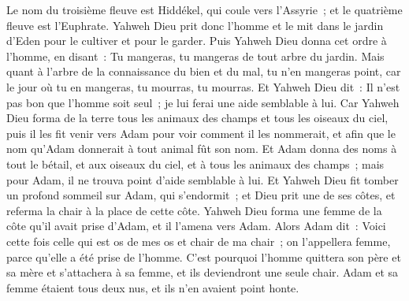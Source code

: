 \begin{multicols}{2}
Le nom du troisième fleuve est Hiddékel, qui coule vers l'Assyrie~; et le quatrième fleuve est l'Euphrate.
Yahweh Dieu prit donc l'homme et le mit dans le jardin d'Eden pour le cultiver et pour le garder.
Puis Yahweh Dieu donna cet ordre à l'homme, en disant~: Tu mangeras, tu mangeras de tout arbre du jardin.
Mais quant à l'arbre de la connaissance du bien et du mal, tu n'en mangeras point, car le jour où tu en mangeras, tu mourras, tu mourras.
Et Yahweh Dieu dit~: Il n'est pas bon que l'homme soit seul~; je lui ferai une aide semblable à lui.
Car Yahweh Dieu forma de la terre tous les animaux des champs et tous les oiseaux du ciel, puis il les fit venir vers Adam pour voir comment il les nommerait, et afin que le nom qu'Adam donnerait à tout animal fût son nom.
Et Adam donna des noms à tout le bétail, et aux oiseaux du ciel, et à tous les animaux des champs~; mais pour Adam, il ne trouva point d'aide semblable à lui.
Et Yahweh Dieu fit tomber un profond sommeil sur Adam, qui s'endormit~; et Dieu prit une de ses côtes, et referma la chair à la place de cette côte.
Yahweh Dieu forma une femme de la côte qu'il avait prise d'Adam, et il l'amena vers Adam.
Alors Adam dit~: Voici cette fois celle qui est os de mes os et chair de ma chair~; on l'appellera femme, parce qu'elle a été prise de l'homme.
C'est pourquoi l'homme quittera son père et sa mère et s'attachera à sa femme, et ils deviendront une seule chair.
Adam et sa femme étaient tous deux nus, et ils n'en avaient point honte.

\end{multicols}

